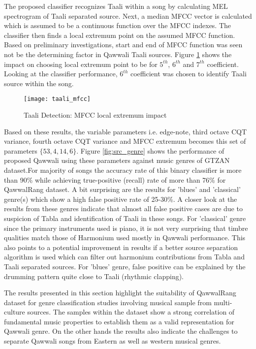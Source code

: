 \documentclass{article}
\begin{document}
The proposed classifier recognizes Taali within a song by calculating MEL spectrogram of Taali separated source. Next, a median MFCC vector is calculated which is assumed to be a continuous function over the MFCC indexes. The classifier then finds a local extremum point on the assumed MFCC function. Based on preliminary investigations, start and end of MFCC function was seen not be the determining factor in Qawwali Taali sources. Figure \ref{fig:src_mfcc} shows the impact on choosing local extremum point to be for $5^{th}$, $6^{th}$ and $7^{th}$ coefficient. Looking at the classifier performance, $6^{th}$ coefficient was chosen to identify Taali source within the song.
\begin{figure}[htbp]
  \centering
  \texttt{[image: taali\_mfcc]}
  \caption{Taali Detection: MFCC local extremum impact}
\label{fig:src_mfcc}
\end{figure}

Based on these results, the variable parameters i.e. edge-note, third octave CQT variance, fourth octave CQT variance and MFCC extremum becomes this set of parameters $\{53, 4, 14, 6\}$. Figure \ref{fig:src_genre} shows the performance of proposed Qawwali using these parameters against music genres of GTZAN dataset.For majority of songs the accuracy rate of this binary classifier is more than 90\% while achieving true-positive (recall) rate of more than 76\% for QawwalRang dataset. A bit surprising are the results for 'blues' and 'classical' genre(s) which show a high false positive rate of 25-30\%. A closer look at the results from these genres indicate that almost all false positive cases are due to suspicion of Tabla and identification of Taali in these songs. For 'classical' genre since the primary instruments used is piano, it is not very surprising that timbre qualities match those of Harmonium used mostly in Qawwali performance. This also points to a potential improvement in results if a better source separation algorithm is used which can filter out harmonium contributions from Tabla and Taali separated sources. For 'blues' genre, false positive can be explained by the drumming pattern quite close to Taali (rhythmic clapping).

The results presented in this section highlight the suitability of QawwalRang dataset for genre classification studies involving musical sample from multi-culture sources. The samples within the dataset show a strong correlation of fundamental music properties to establish them as a valid representation for Qawwali genre. On the other hands the results also indicate the challenges to separate Qawwali songs from Eastern as well as western musical genres.
 
\end{document}
